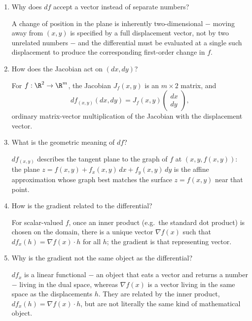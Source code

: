 \documentclass{self-check}
\begin{document}
\begin{enumerate}[resume, leftmargin=*, itemsep=8pt]
\begin{answer}
    \end{answer}
  \item Why does \(df\) accept a vector instead of separate numbers?
    \begin{answer}
      A change of position in the plane is inherently two-dimensional \(-\) moving away from \((x,y)\) is specified by a full displacement vector, not by two unrelated numbers \(-\) and the differential must be evaluated at a single such displacement to produce the corresponding first-order change in \(f\).
    \end{answer}
  \item How does the Jacobian act on \((dx,dy)\)?
    \begin{answer}
      For \(f:\R^{2}\to\R^{m}\), the Jacobian \(J_{f}(x,y)\) is an \(m\times2\) matrix, and
      \[
        df_{(x,y)}(dx,dy) = J_{f}(x,y)
        \begin{pmatrix}
          dx \\
          dy
        \end{pmatrix},
      \]
      ordinary matrix-vector multiplication of the Jacobian with the displacement vector.
    \end{answer}
  \item What is the geometric meaning of \(df\)?
    \begin{answer}
      \(df_{(x,y)}\) describes the tangent plane to the graph of \(f\) at \((x,y,f(x,y))\): the plane \(z=f(x,y)+f_{x}(x,y)\,dx+f_{y}(x,y)\,dy\) is the affine approximation whose graph best matches the surface \(z=f(x,y)\) near that point.
    \end{answer}
  \item How is the gradient related to the differential?
    \begin{answer}
      For scalar-valued \(f\), once an inner product (e.g.\ the standard dot product) is chosen on the domain, there is a unique vector \(\nabla f(x)\) such that \(df_{x}(h)=\nabla f(x)\cdot h\) for all \(h\); the gradient is that representing vector.
    \end{answer}
  \item Why is the gradient not the same object as the differential?
    \begin{answer}
      \(df_{x}\) is a linear functional \(-\) an object that eats a vector and returns a number \(-\) living in the dual space, whereas \(\nabla f(x)\) is a vector living in the same space as the displacements \(h\). They are related by the inner product, \(df_{x}(h)=\nabla f(x)\cdot h\), but are not literally the same kind of mathematical object.

\end{answer}
\end{enumerate}
\end{document}
